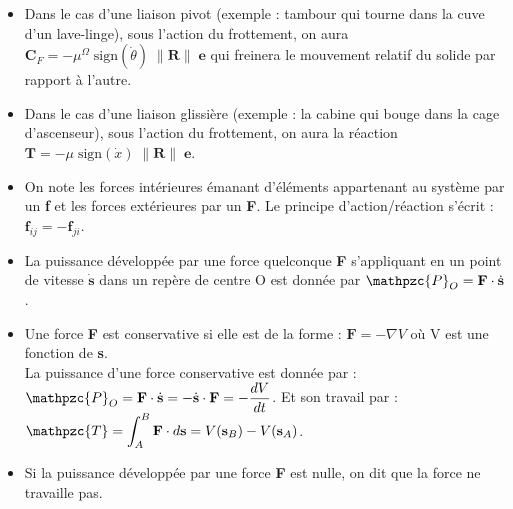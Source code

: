 \documentclass[a4paper]{article}
\begin{document}
\begin{itemize}
\item Dans le cas d'une liaison pivot (exemple : tambour qui tourne dans la cuve d'un lave-linge), sous l'action du frottement, on aura $\displaystyle \textbf{C}_F = - \mu^{\Omega} \; \text{sign}(\dot{\theta}) \; \| \textbf{R} \| \; \textbf{e} $ qui freinera le mouvement relatif du solide par rapport à l'autre.





\item Dans le cas d'une liaison glissière (exemple : la cabine qui bouge dans la cage d'ascenseur), sous l'action du frottement, on aura la réaction $\displaystyle \textbf{T} = - \mu \; \text{sign}(\dot{x}) \; \| \textbf{R} \| \; \textbf{e} $.





\item On note les forces intérieures émanant d'éléments appartenant au système par un \textbf{f} et les forces extérieures par un \textbf{F}.
Le principe d'action/réaction s'écrit : $\displaystyle \textbf{f}_{ij} = - \textbf{f}_{ji} $.





\item La puissance développée par une force quelconque \textbf{F} s'appliquant en un point de vitesse $ \dot{\textbf{s}} $ dans un repère de centre O est donnée par $\displaystyle \mathpzc{P}_O = \textbf{F} \cdot \dot{\textbf{s}} $.





\item Une force \textbf{F} est conservative si elle est de la forme : $\displaystyle \textbf{F} = - \nabla V $ \qquad où V est une fonction de \textbf{s}. \\
La puissance d'une force conservative est donnée par : $\displaystyle \mathpzc{P}_O = \textbf{F} \cdot \dot{\textbf{s}} = - \dot{\textbf{s}} \cdot \textbf{F} = - \frac{d V}{d t} $. Et son travail par : $\displaystyle \mathpzc{T} = \int_A^B \textbf{F} \cdot d \textbf{s} = V(\textbf{s}_B) - V(\textbf{s}_A) $.





\item Si la puissance développée par une force \textbf{F} est nulle, on dit que la force ne travaille pas.






\end{itemize}
\end{document}
